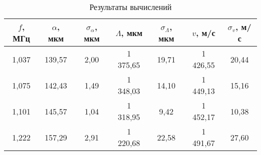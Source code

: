 \begin{table}[h!]
    \centering
    \begin{tabular}{|c|c|c|c|c|c|c|}
    \hline
    $f$, МГц     & $\alpha$, мкм  & $\sigma_{\alpha}$, мкм & $\Lambda$, мкм   & $\sigma_{\Lambda}$, мкм & $v$, м/с        & $\sigma_v$, м/с \\ \hline
    1,037        & 139,57         & 2,00                   & 1 375,65         & 19,71                   & 1 426,55        & 20,44           \\ \hline
    1,075        & 142,43         & 1,49                   & 1 348,03         & 14,10                   & 1 449,13        & 15,16           \\ \hline
    1,101        & 145,57         & 1,04                   & 1 318,95         & 9,42                    & 1 452,17        & 10,38           \\ \hline
    1,222        & 157,29         & 2,91                   & 1 220,68         & 22,58                   & 1 491,67        & 27,60           \\ \hline
    \end{tabular}
    \caption{Результаты вычислений}
    \label{tab:res}
\end{table}